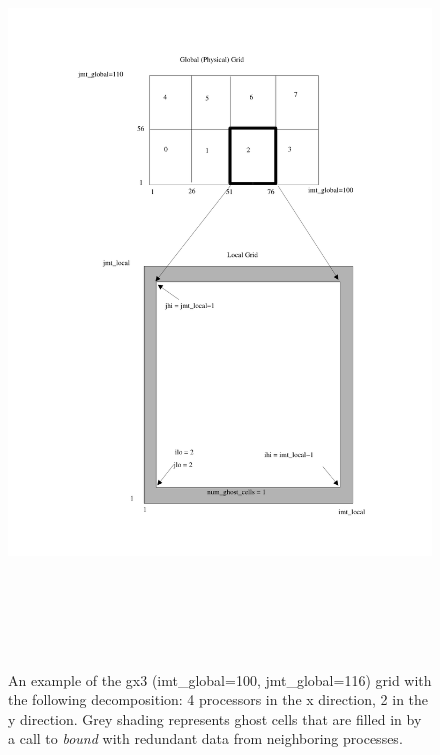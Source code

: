 \begin{figure}[htbp]
  \includegraphics[height=8in]{ice_grid_schematic}  
  \caption{An example of the gx3 (imt\_global=100, jmt\_global=116) grid
           with the following decomposition: 4 processors in the x direction,
           2 in the y direction.  Grey shading represents ghost cells that
           are filled in by a call to {\it bound} with redundant data from
           neighboring processes.}
\label{fig:ice_grid_schematic}
\end{figure}
